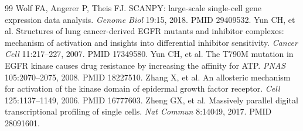 \documentclass{cisXXX} %
\begin{document}
\begin{thebibliography}{99}
 Wolf FA, Angerer P, Theis FJ. SCANPY: large-scale single-cell gene expression data analysis. \emph{Genome Biol} 19:15, 2018. PMID 29409532.
 Yun CH, et al. Structures of lung cancer-derived EGFR mutants and inhibitor complexes: mechanism of activation and insights into differential inhibitor sensitivity. \emph{Cancer Cell} 11:217--227, 2007. PMID 17349580.
 Yun CH, et al. The T790M mutation in EGFR kinase causes drug resistance by increasing the affinity for ATP. \emph{PNAS} 105:2070--2075, 2008. PMID 18227510.
 Zhang X, et al. An allosteric mechanism for activation of the kinase domain of epidermal growth factor receptor. \emph{Cell} 125:1137--1149, 2006. PMID 16777603.
 Zheng GX, et al. Massively parallel digital transcriptional profiling of single cells. \emph{Nat Commun} 8:14049, 2017. PMID 28091601.
\end{thebibliography}
\end{document}
